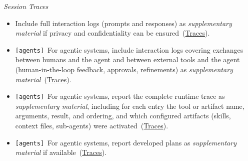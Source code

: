 \documentclass[smallextended]{svjour3}
\makeatletter
\newcommand{\must}{\textbf{must}\xspace}
\newcommand{\should}{\textbf{should}\xspace}
\newcommand{\supplementarymaterial}{\emph{supplementary material}\xspace}
\newcommand{\supplementarymaterial}{\emph{supplementary material}\xspace}
\newcommand{\iconS}{\usebox{\iconSbox}\xspace}
\newcommand{\iconS}{○\xspace}
\newcommand{\condition}[1]{\texttt{\small[#1]}\,}
\newcommand{\condition}[1]{@@cond:#1@@}
\newcommand{\reftraces}{\hyperref[sec:report-session-traces]{Traces}}
\newcommand{\reftraces}{\href{/guidelines/report-session-traces/}{Traces}}
\makeatother
\begin{document}
\begin{appendices}
\noindent\textit{Session Traces}
\begin{itemize}[label={},leftmargin=*]
    \item \iconS Include full interaction logs (prompts and responses) as \supplementarymaterial if privacy and confidentiality can be ensured~(\reftraces).
    \item \iconS \condition{agents} For agentic systems, include interaction logs covering exchanges between humans and the agent and between external tools and the agent (human-in-the-loop feedback, approvals, refinements) as \supplementarymaterial~(\reftraces).
    \item \iconS \condition{agents} For agentic systems, report the complete runtime trace as \supplementarymaterial, including for each entry the tool or artifact name, arguments, result, and ordering, and which configured artifacts (skills, context files, sub-agents) were activated~(\reftraces).
    \item \iconS \condition{agents} For agentic systems, report developed plans as \supplementarymaterial if available~(\reftraces).
\end{itemize}


\end{appendices}
\end{document}
